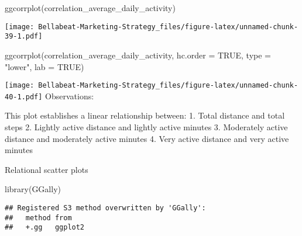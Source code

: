 \documentclass[
]{article}
\newenvironment{Shaded}{\begin{snugshade}}{\end{snugshade}}
\newcommand{\AttributeTok}[1]{\textcolor[rgb]{0.77,0.63,0.00}{#1}}
\newcommand{\ConstantTok}[1]{\textcolor[rgb]{0.00,0.00,0.00}{#1}}
\newcommand{\FunctionTok}[1]{\textcolor[rgb]{0.00,0.00,0.00}{#1}}
\newcommand{\NormalTok}[1]{#1}
\newcommand{\StringTok}[1]{\textcolor[rgb]{0.31,0.60,0.02}{#1}}
\begin{document}
\begin{Shaded}
\begin{Highlighting}[]
\FunctionTok{ggcorrplot}\NormalTok{(correlation\_average\_daily\_activity)}
\end{Highlighting}
\end{Shaded}

\texttt{[image: Bellabeat-Marketing-Strategy\_files/figure-latex/unnamed-chunk-39-1.pdf]}

\begin{Shaded}
\begin{Highlighting}[]
\FunctionTok{ggcorrplot}\NormalTok{(correlation\_average\_daily\_activity, }
           \AttributeTok{hc.order =} \ConstantTok{TRUE}\NormalTok{, }
           \AttributeTok{type =} \StringTok{"lower"}\NormalTok{,}
           \AttributeTok{lab =} \ConstantTok{TRUE}\NormalTok{)}
\end{Highlighting}
\end{Shaded}

\texttt{[image: Bellabeat-Marketing-Strategy\_files/figure-latex/unnamed-chunk-40-1.pdf]}
Observations:

This plot establishes a linear relationship between: 1. Total distance
and total steps 2. Lightly active distance and lightly active minutes 3.
Moderately active distance and moderately active minutes 4. Very active
distance and very active minutes

Relational scatter plots

\begin{Shaded}
\begin{Highlighting}[]
\FunctionTok{library}\NormalTok{(GGally)}
\end{Highlighting}
\end{Shaded}

\begin{verbatim}
## Registered S3 method overwritten by 'GGally':
##   method from   
##   +.gg   ggplot2
\end{verbatim}
\end{document}
